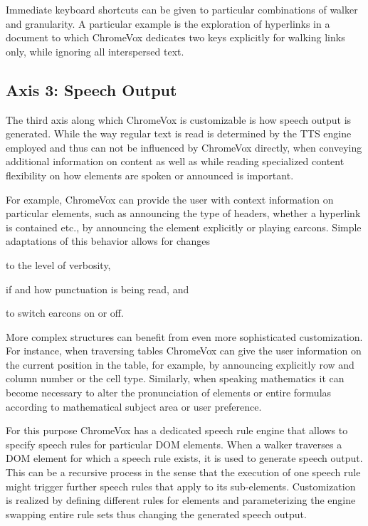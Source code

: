 \documentclass{sig-alternate}
\begin{document}
Immediate keyboard shortcuts can be given to particular combinations of walker
and granularity. A particular example is the exploration of hyperlinks in a
document to which ChromeVox dedicates two keys explicitly for walking links
only, while ignoring all interspersed text.

\subsection{Axis 3: Speech Output}
\label{sec:ax3}

The third axis along which ChromeVox is customizable is how speech output is
generated. While the way regular text is read is determined by the TTS engine
employed and thus can not be influenced by ChromeVox directly, when conveying
additional information on content as well as while reading specialized content
flexibility on how elements are spoken or announced is important.

For example, ChromeVox can provide the user with context information on
particular elements, such as announcing the type of headers, whether a hyperlink
is contained etc., by announcing the element explicitly or playing
earcons. Simple adaptations of this behavior allows for changes
\begin{inparaenum}[(a)]
\item to the level of verbosity,
\item if and how punctuation is being read, and
\item to switch earcons on or off.
\end{inparaenum}

More complex structures can benefit from even more sophisticated customization.
For instance, when traversing tables ChromeVox can give the user information on
the current position in the table, for example, by announcing explicitly row and
column number or the cell type. Similarly, when speaking mathematics it can become
necessary to alter the pronunciation of elements or entire formulas according to
mathematical subject area or user preference.

For this purpose ChromeVox has a dedicated speech rule engine that allows to
specify speech rules for particular DOM elements. When a walker traverses a DOM
element for which a speech rule exists, it is used to generate speech
output. This can be a recursive process in the sense that the execution of one
speech rule might trigger further speech rules that apply to its sub-elements.
Customization is realized by defining different rules for elements and
parameterizing the engine swapping entire rule sets thus changing the generated
speech output.
\end{document}
